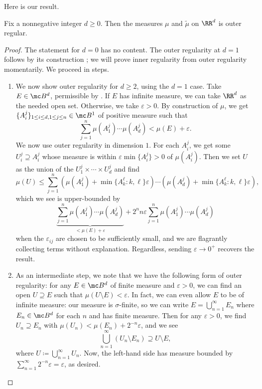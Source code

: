 \documentclass[../notes.tex]{subfiles}
\begin{document}
Here is our result.
\begin{theorem}
	Fix a nonnegative integer $d\ge0$. Then the measures $\mu$ and $\widetilde\mu$ on $\RR^d$ is outer regular.
\end{theorem}
\begin{proof}
	The statement for $d=0$ has no content. The outer regularity at $d=1$ follows by its construction \cite[Lemma~6.15]{elber-top}; we will prove inner regularity from outer regularity momentarily. We proceed in steps.
	\begin{enumerate}
		\item We now show outer regularity for $d\ge2$, using the $d=1$ case. Take $E\in\mc B^d$, permissible by . If $E$ has infinite measure, we can take $\RR^d$ as the needed open set. Otherwise, we take $\varepsilon>0$. By construction of $\mu$, we get $\{A_i^j\}_{1\le i\le d,1\le j\le n}\in\mc B^1$ of positive measure such that
		\[\sum_{j=1}^n\mu(A_1^j)\cdots\mu(A_d^j)<\mu(E)+\varepsilon.\]
		We now use outer regularity in dimension $1$. For each $A_i^j$, we get some $U_i^j\supseteq A_i^j$ whose measure is within $\varepsilon\min\{A_i^j\}>0$ of $\mu(A_i^j)$. Then we set $U$ as the union of the $U_1^j\times\cdots\times U_d^j$ and find
		\[\mu(U)\le\sum_{j=1}^n\left(\mu(A_1^j)+\min\{A_k^\ell:k,\ell\}\varepsilon\right)\cdots\left(\mu(A_d^j)+\min\{A_k^\ell:k,\ell\}\varepsilon\right),\]
		which we see is upper-bounded by
		\[\underbrace{\sum_{j=1}^n\mu(A^j_1)\cdots\mu(A^j_d)}_{<\mu(E)+\varepsilon}{}+2^nn\varepsilon\sum_{j=1}^n\mu(A^j_1)\cdots\mu(A^j_d)\]
		when the $\varepsilon_{ij}$ are chosen to be sufficiently small, and we are flagrantly collecting terms without explanation. Regardless, sending $\varepsilon\to0^+$ recovers the result.

		\item As an intermediate step, we note that we have the following form of outer regularity: for any $E\in\mc B^d$ of finite measure and $\varepsilon>0$, we can find an open $U\supseteq E$ such that $\mu(U\setminus E)<\varepsilon$. In fact, we can even allow $E$ to be of infinite measure: our measure is $\sigma$-finite, so we can write $E=\bigcup_{n=1}^\infty E_n$ where $E_n\in\mc B^d$ for each $n$ and has finite measure. Then for any $\varepsilon>0$, we find $U_n\supseteq E_n$ with $\mu(U_n)<\mu(E_n)+2^{-n}\varepsilon$, and we see
		\[\bigcup_{n=1}^\infty(U_n\setminus E_n)\supseteq U\setminus E,\]
		where $U\coloneqq\bigcup_{n=1}^\infty U_n$. Now, the left-hand side has measure bounded by $\sum_{n=1}^\infty2^{-n}\varepsilon=\varepsilon$, as desired.


\end{enumerate}
\end{proof}
\end{document}

